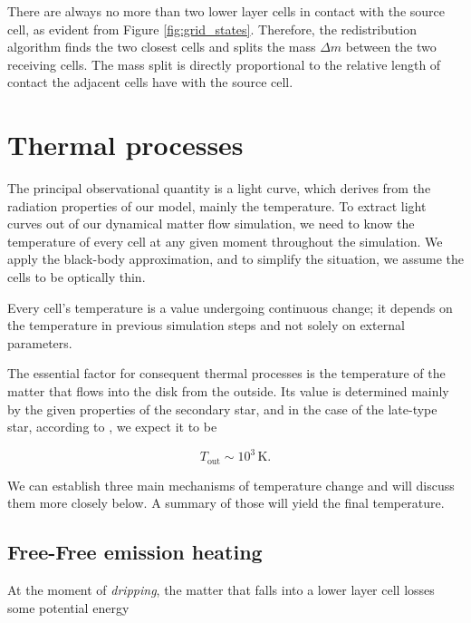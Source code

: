     There are always no more than two lower layer cells in contact with the source cell, as evident from Figure \ref{fig:grid_states}. Therefore, the redistribution algorithm finds the two closest cells and splits the mass $\Delta m$ between the two receiving cells. The mass split is directly proportional to the relative length of contact the adjacent cells have with the source cell.










\section{Thermal processes}
\label{sec:thermal_processes}
    The principal observational quantity is a light curve, which derives from the radiation properties of our model, mainly the temperature. To extract light curves out of our dynamical matter flow simulation, we need to know the temperature of every cell at any given moment throughout the simulation. We apply the black-body approximation, and to simplify the situation, we assume the cells to be optically thin. 

    Every cell's temperature is a value undergoing continuous change; it depends on the temperature in previous simulation steps and not solely on external parameters.

    The essential factor for consequent thermal processes is the temperature of the matter that flows into the disk from the outside. Its value is determined mainly by the given properties of the secondary star, and in the case of the late-type star, according to \cite{allen1973}, we expect it to be

    \begin{equation}
    T_{\mathrm{out}} \sim 10^3\, \mathrm{K}.
    \end{equation}

    We can establish three main mechanisms of temperature change and will discuss them more closely below. A summary of those will yield the final temperature. 

\subsection{Free-Free emission heating}
    At the moment of \emph{dripping}, the matter that falls into a lower layer cell losses some potential energy \cite{yonehara1997} 


